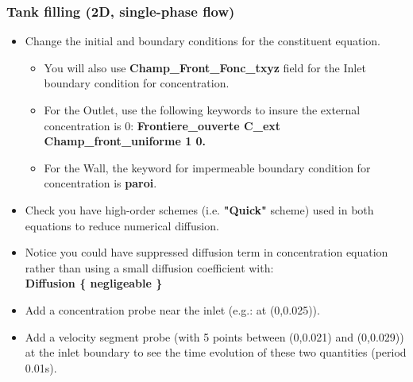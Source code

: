 \documentclass[10pt, hyperref={unicode=true,pdfusetitle, bookmarks=true,bookmarksnumbered=false,bookmarksopen=false, breaklinks=false,pdfborder={0 0l 1},backref=true,colorlinks=true,linkcolor=darkblue,pageanchor}]{beamer}
\begin{document}
\begin{frame}
\frametitle{Tank filling (2D, single-phase flow)}
\begin{block}{}

\begin{itemize}
\item Change the initial and boundary conditions for the constituent equation. 
    \begin{itemize}
    \item [$\circ$] You will also use \textbf{Champ\_Front\_Fonc\_txyz} field for the Inlet boundary condition for concentration.
    \item [$\circ$] For the Outlet, use the following keywords to insure the external concentration is 0:
                    \textbf{Frontiere\_ouverte C\_ext Champ\_front\_uniforme 1 0.} \\
    \item [$\circ$] For the Wall, the keyword for impermeable boundary condition for concentration is \textbf{paroi}.
    \end{itemize}
\item Check you have high-order schemes (i.e. \textbf{"Quick"} scheme) used in both equations to reduce numerical diffusion. 
\item Notice you could have suppressed diffusion term in concentration equation rather than using a small diffusion coefficient with:\\
\textbf{Diffusion \{ negligeable \}}
\item Add a concentration probe near the inlet (e.g.: at (0,0.025)).
\item Add a velocity segment probe (with 5 points between (0,0.021) and (0,0.029)) at the inlet boundary to see the time evolution of these two quantities (period 0.01s).
\end{itemize}

\end{block}
\end{frame}
\end{document}
